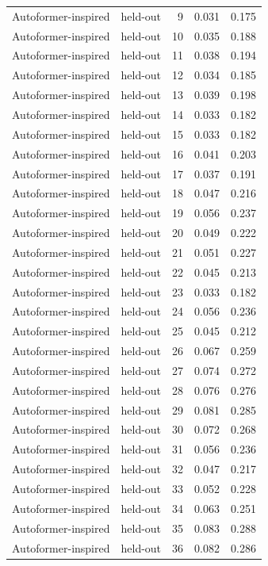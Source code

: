 \begin{tabular}{llrrr}
Autoformer-inspired & held-out & 9 & 0.031 & 0.175 \\
Autoformer-inspired & held-out & 10 & 0.035 & 0.188 \\
Autoformer-inspired & held-out & 11 & 0.038 & 0.194 \\
Autoformer-inspired & held-out & 12 & 0.034 & 0.185 \\
Autoformer-inspired & held-out & 13 & 0.039 & 0.198 \\
Autoformer-inspired & held-out & 14 & 0.033 & 0.182 \\
Autoformer-inspired & held-out & 15 & 0.033 & 0.182 \\
Autoformer-inspired & held-out & 16 & 0.041 & 0.203 \\
Autoformer-inspired & held-out & 17 & 0.037 & 0.191 \\
Autoformer-inspired & held-out & 18 & 0.047 & 0.216 \\
Autoformer-inspired & held-out & 19 & 0.056 & 0.237 \\
Autoformer-inspired & held-out & 20 & 0.049 & 0.222 \\
Autoformer-inspired & held-out & 21 & 0.051 & 0.227 \\
Autoformer-inspired & held-out & 22 & 0.045 & 0.213 \\
Autoformer-inspired & held-out & 23 & 0.033 & 0.182 \\
Autoformer-inspired & held-out & 24 & 0.056 & 0.236 \\
Autoformer-inspired & held-out & 25 & 0.045 & 0.212 \\
Autoformer-inspired & held-out & 26 & 0.067 & 0.259 \\
Autoformer-inspired & held-out & 27 & 0.074 & 0.272 \\
Autoformer-inspired & held-out & 28 & 0.076 & 0.276 \\
Autoformer-inspired & held-out & 29 & 0.081 & 0.285 \\
Autoformer-inspired & held-out & 30 & 0.072 & 0.268 \\
Autoformer-inspired & held-out & 31 & 0.056 & 0.236 \\
Autoformer-inspired & held-out & 32 & 0.047 & 0.217 \\
Autoformer-inspired & held-out & 33 & 0.052 & 0.228 \\
Autoformer-inspired & held-out & 34 & 0.063 & 0.251 \\
Autoformer-inspired & held-out & 35 & 0.083 & 0.288 \\
Autoformer-inspired & held-out & 36 & 0.082 & 0.286 \\

\end{tabular}
